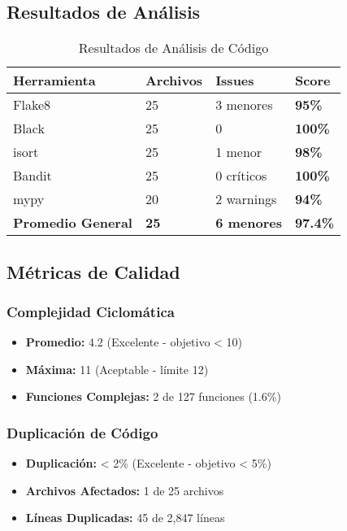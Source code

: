 \documentclass[12pt,a4paper]{article}
\begin{document}
\subsection{Resultados de Análisis}

\begin{table}[h]
\centering
\begin{tabularx}{\textwidth}{|X|X|X|X|}
\hline
\textbf{Herramienta} & \textbf{Archivos} & \textbf{Issues} & \textbf{Score} \\
\hline
Flake8 & 25 & 3 menores & \textcolor{epngreen}{\textbf{95\%}} \\
\hline
Black & 25 & 0 & \textcolor{epngreen}{\textbf{100\%}} \\
\hline
isort & 25 & 1 menor & \textcolor{epngreen}{\textbf{98\%}} \\
\hline
Bandit & 25 & 0 críticos & \textcolor{epngreen}{\textbf{100\%}} \\
\hline
mypy & 20 & 2 warnings & \textcolor{epngreen}{\textbf{94\%}} \\
\hline
\textbf{Promedio General} & \textbf{25} & \textbf{6 menores} & \textcolor{epngreen}{\textbf{97.4\%}} \\
\hline
\end{tabularx}
\caption{Resultados de Análisis de Código}
\end{table}

\subsection{Métricas de Calidad}

\subsubsection{Complejidad Ciclomática}

\begin{itemize}
    \item \textbf{Promedio:} 4.2 (Excelente - objetivo < 10)
    \item \textbf{Máxima:} 11 (Aceptable - límite 12)
    \item \textbf{Funciones Complejas:} 2 de 127 funciones (1.6\%)
\end{itemize}

\subsubsection{Duplicación de Código}

\begin{itemize}
    \item \textbf{Duplicación:} < 2\% (Excelente - objetivo < 5\%)
    \item \textbf{Archivos Afectados:} 1 de 25 archivos
    \item \textbf{Líneas Duplicadas:} 45 de 2,847 líneas
\end{itemize}
\end{document}
